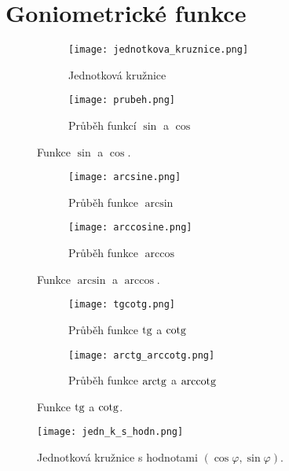 \appendix
\section{Goniometrické funkce}\label{appa}

\begin{figure}[h!]
     \centering
     \begin{subfigure}{0.26\textwidth}
         \centering
         \texttt{[image: jednotkova\_kruznice.png]}
         \caption{Jednotková kružnice}
     \end{subfigure}
     \begin{subfigure}{0.65\textwidth}
         \centering
         \texttt{[image: prubeh.png]}
         \caption{Průběh funkcí $\sin$ a $\cos$}
     \end{subfigure}
     \caption{Funkce $\sin$ a $\cos$.}
\end{figure}

\begin{figure}[h!]
     \centering
     \begin{subfigure}{0.49\textwidth}
         \centering
         \texttt{[image: arcsine.png]}
         \caption{Průběh funkce $\arcsin$}
     \end{subfigure}
     \begin{subfigure}{0.49\textwidth}
         \centering
         \texttt{[image: arccosine.png]}
         \caption{Průběh funkce $\arccos$}
     \end{subfigure}
     \caption{Funkce $\arcsin$ a $\arccos$.}
\end{figure}

\begin{figure}[h!]
     \centering
     \begin{subfigure}{0.49\textwidth}
         \centering
         \texttt{[image: tgcotg.png]}
         \caption{Průběh funkce $\operatorname{tg}$ a $\operatorname{cotg}$}
     \end{subfigure}
     \begin{subfigure}{0.49\textwidth}
         \centering
         \texttt{[image: arctg\_arccotg.png]}
         \caption{Průběh funkce $\operatorname{arctg}$ a $\operatorname{arccotg}$}
     \end{subfigure}
     \caption{Funkce $\operatorname{tg}$ a $\operatorname{cotg}$.}
\end{figure}

\begin{figure}[h!]
     \centering
     \texttt{[image: jedn\_k\_s\_hodn.png]}
     \caption{Jednotková kružnice s hodnotami $(\cos \varphi, \sin \varphi).$}
     \label{kruzsh}
\end{figure}

